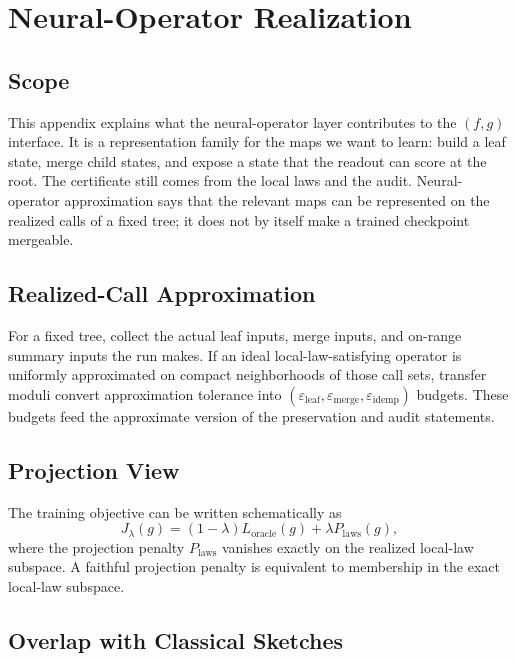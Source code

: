 \section{Neural-Operator Realization}\label{app:min-neural}

\subsection{Scope}

This appendix explains what the neural-operator layer contributes to the
$(f,g)$ interface. It is a representation family for the maps we want to
learn: build a leaf state, merge child states, and expose a state that the
readout can score at the root. The certificate still comes from the local laws
and the audit. Neural-operator approximation says that the relevant maps can
be represented on the realized calls of a fixed tree; it does not by itself
make a trained checkpoint mergeable.

\subsection{Realized-Call Approximation}

For a fixed tree, collect the actual leaf inputs, merge inputs, and on-range
summary inputs the run makes. If an ideal local-law-satisfying operator is
uniformly approximated on compact neighborhoods of those call sets, transfer
moduli convert approximation tolerance into
$(\varepsilon_{\mathrm{leaf}},\varepsilon_{\mathrm{merge}},
\varepsilon_{\mathrm{idemp}})$ budgets. These budgets feed the approximate
version of the preservation and audit statements.

\subsection{Projection View}

The training objective can be written schematically as
\[
J_\lambda(g)
=
(1-\lambda)L_{\mathrm{oracle}}(g)
+\lambda P_{\mathrm{laws}}(g),
\]
where the projection penalty $P_{\mathrm{laws}}$ vanishes exactly on the
realized local-law subspace. A faithful projection penalty is equivalent
to membership in the exact local-law subspace.

\subsection{Overlap with Classical Sketches}

